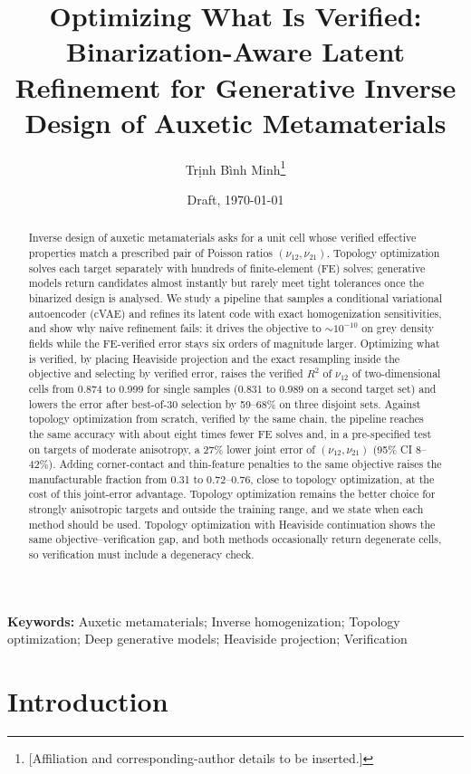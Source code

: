 \documentclass[a4paper,11pt]{article}
\title{Optimizing What Is Verified: Binarization-Aware Latent Refinement for
Generative Inverse Design of Auxetic Metamaterials}
\author{Trịnh Bình Minh\thanks{[Affiliation and corresponding-author details to be inserted.]}}
\date{Draft, \today}
\newcommand{\nuot}{\nu_{12}}
\newcommand{\nuto}{\nu_{21}}
\newcommand{\RR}{R^2}
\begin{document}
\maketitle

\begin{abstract}
Inverse design of auxetic metamaterials asks for a unit cell whose verified
effective properties match a prescribed pair of Poisson ratios
$(\nuot,\nuto)$. Topology optimization solves each target separately with
hundreds of finite-element (FE) solves; generative models return candidates
almost instantly but rarely meet tight tolerances once the binarized design
is analysed. We study a pipeline that samples a conditional variational
autoencoder (cVAE) and refines its latent code with exact homogenization
sensitivities, and show why naive refinement fails: it drives the objective
to $\sim\!10^{-10}$ on grey density fields while the FE-verified error stays
six orders of magnitude larger. Optimizing what is verified, by placing
Heaviside projection and the exact resampling inside the objective and
selecting by verified error, raises the verified $\RR$ of $\nuot$ of
two-dimensional cells from 0.874 to 0.999 for single samples (0.831 to 0.989
on a second target set) and lowers the error after best-of-30 selection by
59--68\% on three disjoint sets. Against topology optimization from scratch,
verified by the same chain, the pipeline reaches the same accuracy with about
eight times fewer FE solves and, in a pre-specified test on targets of
moderate anisotropy, a 27\% lower joint error of $(\nuot,\nuto)$ (95\% CI
8--42\%). Adding corner-contact and thin-feature penalties to the same
objective raises the manufacturable fraction from 0.31 to 0.72--0.76, close
to topology optimization, at the cost of this joint-error advantage.
Topology optimization remains the better choice for strongly anisotropic
targets and outside the training range, and we state when each method
should be used. Topology optimization with
Heaviside continuation shows the same objective--verification gap, and both
methods occasionally return degenerate cells, so verification must include a
degeneracy check.
\end{abstract}

\noindent\textbf{Keywords:} Auxetic metamaterials; Inverse homogenization;
Topology optimization; Deep generative models; Heaviside projection;
Verification

\section{Introduction}
\end{document}
